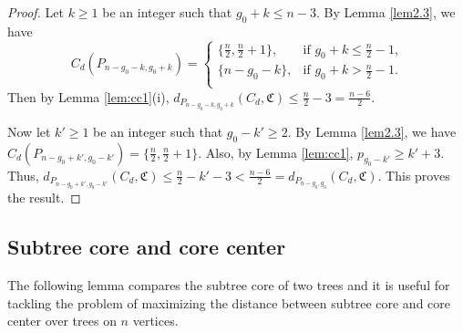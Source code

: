 \documentclass[10pt,a4paper]{amsart}
\begin{document}
\begin{proof}
Let $k\geq 1$ be an integer such that $g_0+k\leq n-3$. By Lemma \ref{lem2.3}, we have 
$$C_d(P_{n-g_0-k,g_0+k})=\left\{
\begin{array}{ll}
 \{\frac{n}{2},\frac{n}{2}+1 \},  &\text{if $g_0+k\leq \frac{n}{2}-1$,}\\
  \{n-g_0-k\}, &\text{if $g_0+k> \frac{n}{2}-1$.}\\
\end{array}
\right.$$ 
Then by Lemma \ref{lem:cc1}(i), $d_{P_{n - g_0-k, g_0+k}}(C_d,\mathfrak{C})\leq \frac{n}{2} - 3=\frac{n-6}{2}.$

Now let $k'\geq 1$ be an integer such that $g_0-k'\geq 2$. By Lemma \ref{lem2.3}, we have $C_d(P_{n-g_0+k',g_0-k'})=\{\frac{n}{2},\frac{n}{2}+1 \}.$ Also, by Lemma \ref{lem:cc1}, $ p_{g_0-k'}\geq k'+3$. Thus, $d_{P_{n - g_0+k', g_0-k'}}(C_d,\mathfrak{C})\leq \frac{n}{2}-k'-3<\frac{n-6}{2}=d_{P_{n - g_0, g_0}}(C_d,\mathfrak{C})$. This proves the result.
\end{proof}


\subsection{Subtree core and core center}

The following lemma compares the subtree core of two trees and it is useful for tackling the problem of maximizing the distance between subtree core and core center over trees on $n$ vertices.
\end{document}
